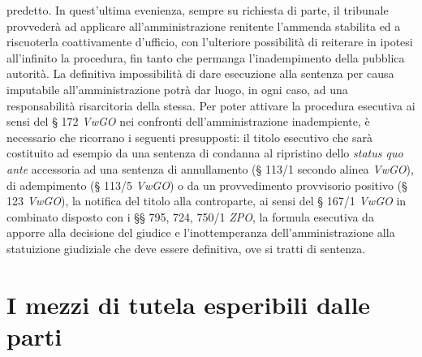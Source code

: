 \documentclass[12pt,it,a4paper,]{report}
\begin{document}
predetto. In quest'ultima evenienza, sempre su richiesta di parte, il
tribunale provvederà ad applicare all'amministrazione renitente
l'ammenda stabilita ed a riscuoterla coattivamente d'ufficio, con
l'ulteriore possibilità di reiterare in ipotesi all'infinito la
procedura, fin tanto che permanga l'inadempimento della pubblica
autorità. La definitiva impossibilità di dare esecuzione alla sentenza
per causa imputabile all'amministrazione potrà dar luogo, in ogni caso,
ad una responsabilità risarcitoria della stessa. Per poter attivare la
procedura esecutiva ai sensi del § 172 \emph{VwGO} nei confronti
dell'amministrazione inadempiente, è necessario che ricorrano i seguenti
presupposti: il titolo esecutivo che sarà costituito ad esempio da una
sentenza di condanna al ripristino dello \emph{status quo ante}
accessoria ad una sentenza di annullamento (§ 113/1 secondo alinea
\emph{VwGO}), di adempimento (§ 113/5 \emph{VwGO}) o da un provvedimento
provvisorio positivo (§ 123 \emph{VwGO}), la notifica del titolo alla
controparte, ai sensi del § 167/1 \emph{VwGO} in combinato disposto con
i §§ 795, 724, 750/1 \emph{ZPO}, la formula esecutiva da apporre alla
decisione del giudice e l'inottemperanza dell'amministrazione alla
statuizione giudiziale che deve essere definitiva, ove si tratti di
sentenza.

\hypertarget{i-mezzi-di-tutela-esperibili-dalle-parti}{%
\section{I mezzi di tutela esperibili dalle
parti}\label{i-mezzi-di-tutela-esperibili-dalle-parti}}
\end{document}
